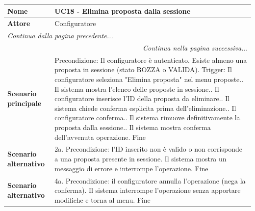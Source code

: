 \documentclass[12pt, a4paper, oneside]{report}
\begin{document}
\renewcommand{\arraystretch}{1.4} 

\begin{tabularx}{\textwidth}{|l|X|}
    \hline
    \textbf{Nome}               & \textbf{UC18 - Elimina proposta dalla sessione} \\ \hline
    \textbf{Attore}             & Configuratore \\ \hline
    \endfirsthead 

    \hline
    \multicolumn{2}{|l|}{\textit{Continua dalla pagina precedente...}} \\ \hline
    \endhead 

    \hline
    \multicolumn{2}{|r|}{\textit{Continua nella pagina successiva...}} \\ \hline
    \endfoot 

    \hline
    \endlastfoot

    \textbf{Scenario principale} & 
    Precondizione: Il configuratore è autenticato. Esiste almeno una proposta in sessione (stato BOZZA o VALIDA).\newline
    Trigger: Il configuratore seleziona "Elimina proposta" nel menu proposte.\newline
    1. Il sistema mostra l'elenco delle proposte in sessione.\newline
    2. Il configuratore inserisce l'ID della proposta da eliminare.\newline
    3. Il sistema chiede conferma esplicita prima dell'eliminazione.\newline
    4. Il configuratore conferma.\newline
    5. Il sistema rimuove definitivamente la proposta dalla sessione.\newline
    6. Il sistema mostra conferma dell'avvenuta operazione.\newline
    Fine \\ \hline
    
    \textbf{Scenario alternativo} & 
    2a. Precondizione: l'ID inserito non è valido o non corrisponde a una proposta presente in sessione.\newline
    Il sistema mostra un messaggio di errore e interrompe l'operazione.\newline
    Fine \\ \hline

    \textbf{Scenario alternativo} & 
    4a. Precondizione: il configuratore annulla l'operazione (nega la conferma).\newline
    Il sistema interrompe l'operazione senza apportare modifiche e torna al menu.\newline
    Fine \\ \hline
\end{tabularx}
\end{document}
